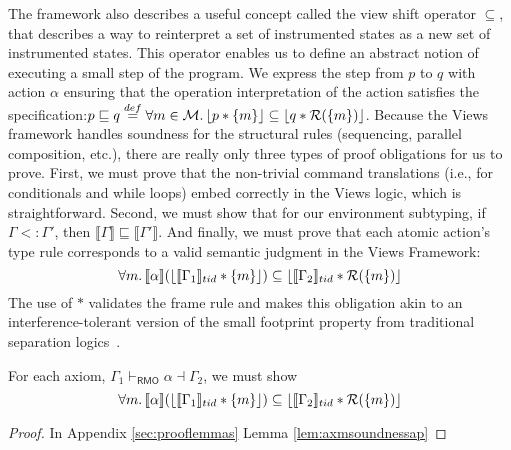 The framework also describes a useful concept called the view shift operator $\subseteq$, that describes a way to reinterpret a set of instrumented states as a new set of instrumented states. This operator enables us to define an abstract notion of executing a small step of the program. We express the step from $p$ to $q$ with action $\alpha$ ensuring that the operation interpretation of the action satisfies the specification:$ p \sqsubseteq q \stackrel{def}{=} \forall m\in\mathcal{M} \ldotp \lfloor p * \{ m \} \rfloor \subseteq \lfloor q* \mathcal{R}(\{m\})\rfloor$. Because the Views framework handles soundness for the structural rules (sequencing, parallel composition, etc.), there are really only three types of proof obligations for us to prove.  First, we must prove that the non-trivial command translations (i.e., for conditionals and while loops) embed correctly in the Views logic, which is straightforward.  Second, we must show that for our environment subtyping, if $\Gamma<:\Gamma'$, then $\llbracket{\Gamma}\rrbracket\sqsubseteq\llbracket\Gamma'\rrbracket$.  And finally, we must prove that each atomic action's type rule corresponds to a valid semantic judgment in the Views Framework:
\[
\forall m\ldotp   \llbracket \alpha \rrbracket ( \lfloor \llbracket \Gamma_{1} \rrbracket_{tid}  * \{m\} \rfloor) \subseteq
  \lfloor \llbracket \Gamma_{2} \rrbracket_{tid} * \mathcal{R}(\{m\}) \rfloor
  \]
The use of $*$ validates the frame rule and makes this obligation akin to an interference-tolerant version of the small footprint property from traditional separation logics~\cite{Reynolds:2002:SLL:645683.664578,Calcagno:2007:LAA:1270399.1271718}.
\begin{lemma}
  \label{lem:axmsoundness}
For each axiom, $\Gamma_{1} \vdash_{\textsf{RMO}} \alpha \dashv \Gamma_{2}$, we must show
\[
\forall m\ldotp   \llbracket \alpha \rrbracket  (\lfloor \llbracket \Gamma_{1} \rrbracket_{tid}  * \{m\} \rfloor )\subseteq  \lfloor \llbracket \Gamma_{2} \rrbracket_{tid} * \mathcal{R}(\{m\}) \rfloor
\]
\end{lemma}
\begin{proof}
In Appendix \ref{sec:prooflemmas} Lemma \ref{lem:axmsoundnessap}
\end{proof}


